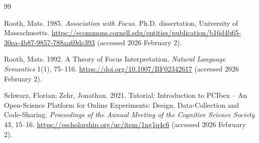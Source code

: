 \documentclass[ruler]{CUP-JNL-LIN}%
\begin{document}
\begin{Backmatter}
\begin{thebibliography}{99}

{Rooth, Mats}. 1985. \textit{Association with Focus.} Ph.D. dissertation, University of Massachusetts. \url{https://ecommons.cornell.edu/entities/publication/b16d4b65-30ea-4b87-9857-788aa69dc393} (accessed 2026 February 2).




{Rooth, Mats}. 1992. A Theory of Focus Interpretation. \textit{Natural Language Semantics} 1(1), 75--116. \url{https://doi.org/10.1007/BF02342617} (accessed 2026 February 2).




{Schwarz, Florian; Zehr, Jonathan}. 2021. Tutorial: Introduction to PCIbex – An Open-Science Platform for Online Experiments: Design, Data-Collection and Code-Sharing. \textit{Proceedings of the Annual Meeting of the Cognitive Science Society} 43, 15–16. \url{https://escholarship.org/uc/item/1ng1q4c6} (accessed 2026 February 2).



\end{thebibliography}
\end{Backmatter}
\end{document}
